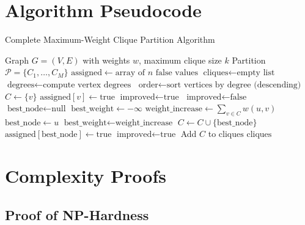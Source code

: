 \documentclass[12pt,a4paper]{article}
\begin{document}
\appendix

\section{Algorithm Pseudocode}

\begin{algorithm}
\caption{Complete Maximum-Weight Clique Partition Algorithm}
\begin{algorithmic}[1]
\REQUIRE Graph $G = (V, E)$ with weights $w$, maximum clique size $k$
\ENSURE Partition $\mathcal{P} = \{C_1, \ldots, C_M\}$
\STATE $\text{assigned} \leftarrow \text{array of } n \text{ false values}$
\STATE $\text{cliques} \leftarrow \text{empty list}$
\STATE $\text{degrees} \leftarrow \text{compute vertex degrees}$
\STATE $\text{order} \leftarrow \text{sort vertices by degree (descending)}$
        \STATE $C \leftarrow \{v\}$
        \STATE $\text{assigned}[v] \leftarrow \text{true}$
        \STATE $\text{improved} \leftarrow \text{true}$
            \STATE $\text{improved} \leftarrow \text{false}$
            \STATE $\text{best\_node} \leftarrow \text{null}$
            \STATE $\text{best\_weight} \leftarrow -\infty$
                    \STATE $\text{weight\_increase} \leftarrow \sum_{v \in C} w(u,v)$
                        \STATE $\text{best\_node} \leftarrow u$
                        \STATE $\text{best\_weight} \leftarrow \text{weight\_increase}$
                    \ENDIF
                \ENDIF
            \ENDFOR
                \STATE $C \leftarrow C \cup \{\text{best\_node}\}$
                \STATE $\text{assigned}[\text{best\_node}] \leftarrow \text{true}$
                \STATE $\text{improved} \leftarrow \text{true}$
            \ENDIF
        \ENDWHILE
        \STATE Add $C$ to $\text{cliques}$
    \ENDIF
\ENDFOR
\RETURN $\text{cliques}$
\end{algorithmic}
\end{algorithm}

\section{Complexity Proofs}

\subsection{Proof of NP-Hardness}
\end{document}
